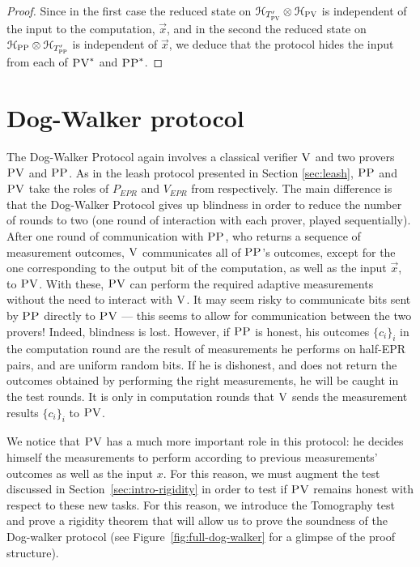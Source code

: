 \begin{proof}
Since in the first case the reduced state on $\mathcal{H}_{T'_{\textsc{PV}}} \otimes \mathcal{H}_{\textsc{PV}}$ is independent of the input to the computation, $\vec{x}$, and in the second  the reduced state on $ \mathcal{H}_{\textsc{PP}}\otimes \mathcal{H}_{T'_{\textsc{PP}}} $ is independent of $\vec{x}$, we deduce that the protocol hides the input from each of $\textsc{PV}^*$ and $\textsc{PP}^*$. 
\end{proof}



\section{Dog-Walker protocol}
\label{sec:dog-walker}
The Dog-Walker Protocol again involves a classical verifier $\textsc{V}$ and two provers $\textsc{PV}$ and $\textsc{PP}$. As in the leash protocol presented in Section \ref{sec:leash}, $\textsc{PP}$ and $\textsc{PV}$ take the roles of $P_{EPR}$ and $V_{EPR}$ from \cite{broadbent15howtoverify} respectively. 
The main difference is that the Dog-Walker Protocol gives up blindness in order to reduce the number of rounds to two (one round of interaction with each prover, played sequentially). After 
one
round of communication with $\textsc{PP}$, who returns a sequence of measurement outcomes, %
$\textsc{V}$ communicates all of $\textsc{PP}$'s outcomes, except for the one corresponding to the output bit of the computation, as well as the input 
$\vec{x}$,
to $\textsc{PV}$.  
With 
these, $\textsc{PV}$ can perform the required adaptive measurements without the need to interact with 
$\textsc{V}$.
It may seem %
risky to communicate bits sent by $\textsc{PP}$ directly to $\textsc{PV}$ --- this seems to allow for communication between the two provers! Indeed, blindness is lost. However, if $\textsc{PP}$ is honest, his outcomes $\{c_i\}_i$ in the computation round are the result of measurements he performs on half-EPR pairs, and are uniform random bits. If he is dishonest, and does not return the outcomes  obtained by performing the right measurements, he will be caught in the test rounds. It is only in computation rounds that $\textsc{V}$ sends the measurement results $\{c_i\}_i$ to $\textsc{PV}$. 

We notice that $\textsc{PV}$ has a much more important role in this protocol: he
decides himself the measurements to perform according to previous measurements'
outcomes as well as the input $x$. For this reason, we must augment the test
discussed in Section~\ref{sec:intro-rigidity} in order to test if $\textsc{PV}$ remains
honest with respect to these new tasks.  For this reason, we introduce the Tomography test and prove a
rigidity theorem that will allow us to prove the soundness of the Dog-walker
protocol
(see Figure~\ref{fig:full-dog-walker} for a glimpse of the proof
structure).


